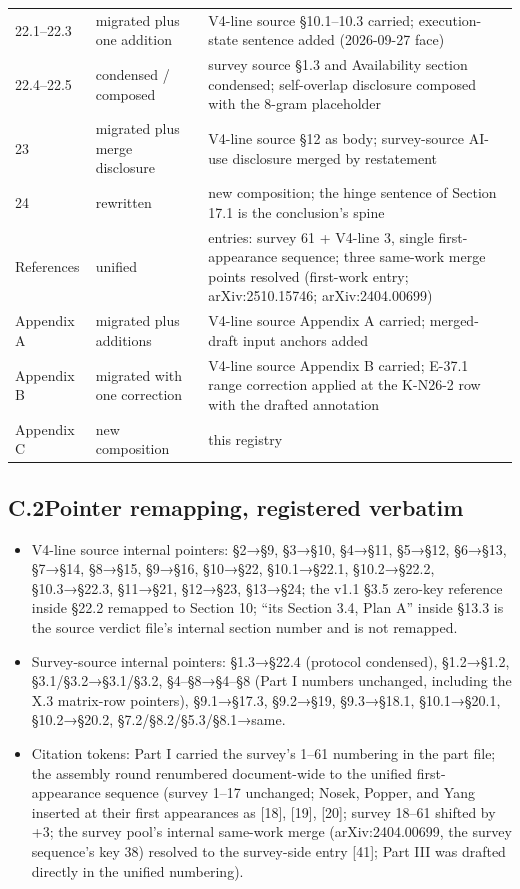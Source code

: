 \documentclass[11pt]{article}
\begin{document}
\begin{longtable}{@{}l p{} >{\raggedright\arraybackslash}p{}@{}}
22.1–22.3 & migrated plus one addition & V4-line source §10.1–10.3 carried; execution-state sentence added (2026-09-27 face) \\
22.4–22.5 & condensed / composed & survey source §1.3 and Availability section condensed; self-overlap disclosure composed with the 8-gram placeholder \\
23 & migrated plus merge disclosure & V4-line source §12 as body; survey-source AI-use disclosure merged by restatement \\
24 & rewritten & new composition; the hinge sentence of Section 17.1 is the conclusion's spine \\
References & unified & 64 entries: survey 61 + V4-line 3, single first-appearance sequence; three same-work merge points resolved (first-work entry; arXiv:2510.15746; arXiv:2404.00699) \\
Appendix A & migrated plus additions & V4-line source Appendix A carried; merged-draft input anchors added \\
Appendix B & migrated with one correction & V4-line source Appendix B carried; E-37.1 range correction applied at the K-N26-2 row with the drafted annotation \\
Appendix C & new composition & this registry \\
\bottomrule
\end{longtable}
\endgroup
\subsection*{C.2\quad Pointer remapping, registered verbatim}
\begin{itemize}[leftmargin=1.6em,itemsep=2pt,parsep=0pt,topsep=3pt]
\item V4-line source internal pointers: §2→§9, §3→§10, §4→§11, §5→§12, §6→§13, §7→§14, §8→§15, §9→§16, §10→§22, §10.1→§22.1, §10.2→§22.2, §10.3→§22.3, §11→§21, §12→§23, §13→§24; the v1.1 §3.5 zero-key reference inside §22.2 remapped to Section 10; ``its Section 3.4, Plan A'' inside §13.3 is the source verdict file's internal section number and is not remapped.
\item Survey-source internal pointers: §1.3→§22.4 (protocol condensed), §1.2→§1.2, §3.1/§3.2→§3.1/§3.2, §4–§8→§4–§8 (Part I numbers unchanged, including the X.3 matrix-row pointers), §9.1→§17.3, §9.2→§19, §9.3→§18.1, §10.1→§20.1, §10.2→§20.2, §7.2/§8.2/§5.3/§8.1→same.
\item Citation tokens: Part I carried the survey's 1–61 numbering in the part file; the assembly round renumbered document-wide to the unified first-appearance sequence (survey 1–17 unchanged; Nosek, Popper, and Yang inserted at their first appearances as [18], [19], [20]; survey 18–61 shifted by +3; the survey pool's internal same-work merge (arXiv:2404.00699, the survey sequence's key 38) resolved to the survey-side entry [41]; Part III was drafted directly in the unified numbering).
\end{itemize}
\end{document}
